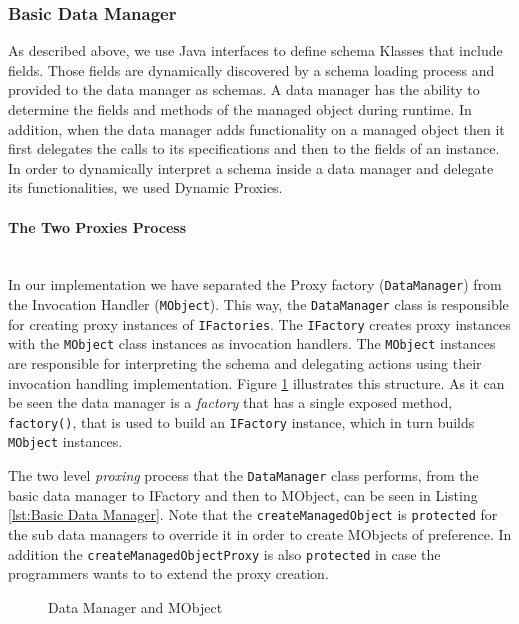 \subsubsection{Basic Data Manager}
As described above, we use Java interfaces to define schema Klasses that include fields. 
Those fields are dynamically discovered by a schema loading process and provided to the data manager as schemas.
A data manager has the ability to determine the fields and methods of the managed object during runtime.
In addition, when the data manager adds functionality on a managed object then it first delegates the calls to its specifications and then to the fields of an instance.
In order to dynamically interpret a schema inside a data manager and delegate its functionalities, we used Dynamic Proxies.

\paragraph{The Two Proxies Process} \mbox{}\\
In our implementation we have separated the Proxy factory (\texttt{DataManager}) from the Invocation Handler (\texttt{MObject}).
This way, the \texttt{DataManager} class is responsible for creating proxy instances of \texttt{IFactories}. 
The \texttt{IFactory} creates proxy instances with the \texttt{MObject} class instances as invocation handlers.
The \texttt{MObject} instances are responsible for interpreting the schema and delegating actions using their invocation handling implementation. 
Figure \ref{fig:DataManager_and_MObject} illustrates this structure.	
As it can be seen the data manager is a \textit{factory} that has a single exposed method, \texttt{factory()}, that is used to build an \texttt{IFactory} instance, which in turn builds \texttt{MObject} instances.

The two level \textit{proxing} process that the \texttt{DataManager} class performs, from the basic data manager to IFactory and then to MObject, can be seen in Listing \ref{lst:Basic Data Manager}.
Note that the \texttt{createManagedObject} is \texttt{protected} for the sub data managers to override it in order to create MObjects of preference.
In addition the \texttt{createManagedObjectProxy} is also \texttt{protected} in case the programmers wants to to extend the proxy creation.

\begin{figure}[H]
	\centering
  	\caption{Data Manager and MObject}
  	\label{fig:DataManager_and_MObject}
\end{figure}

